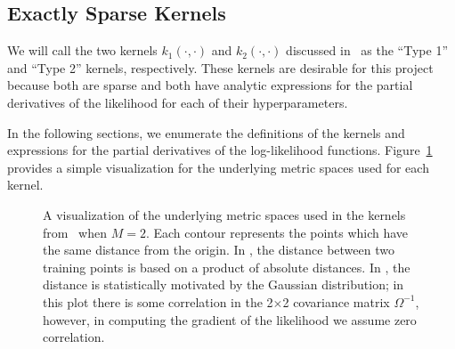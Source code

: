 \subsection{Exactly Sparse Kernels}
\label{sub:exactlysparsekernels}

We will call the two kernels $k_1(\cdot, \cdot)$ and $k_2(\cdot, \cdot)$ discussed
in~\cite{melkumyan2009sparse} as the ``Type 1'' and ``Type 2'' kernels, respectively.
These kernels are desirable for this project because both are sparse and both have
analytic expressions for the partial derivatives of the likelihood for each of their
hyperparameters.

In the following sections, we enumerate the definitions of the kernels and expressions for
the partial derivatives of the log-likelihood functions.  Figure~\ref{fig:dist} provides a
simple visualization for the underlying metric spaces used for each kernel.

\begin{figure}[t]
  \begin{center}
    \caption{A visualization of the underlying metric spaces used in the kernels
      from~\cite{melkumyan2009sparse} when $M=2$.  Each contour represents the points
      which have the same distance from the origin.  In , the
      distance between two training points is based on a product of absolute distances.
      In , the distance is statistically motivated by the Gaussian
      distribution; in this plot there is some correlation in the 2$\times$2 covariance
      matrix $\Omega^{-1}$, however, in computing the gradient of the likelihood we assume
      zero correlation.}
    \label{fig:dist}
  \end{center}
\end{figure}

